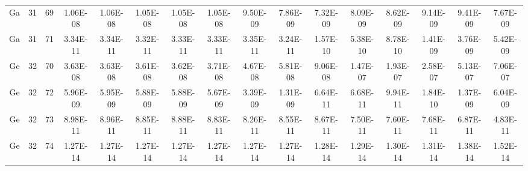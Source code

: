 {\begin{tabular}{|c|c|c|c|c|c|c|c|c|c|c|c|c|c|c|c|}
Ga & 31 & 69   & 1.06E-08 & 1.06E-08 & 1.05E-08 & 1.05E-08 & 1.05E-08 & 9.50E-09 & 7.86E-09 & 7.32E-09 & 8.09E-09 & 8.62E-09 & 9.14E-09 & 9.41E-09 & 7.67E-09 \\
Ga & 31 & 71   & 3.34E-11 & 3.34E-11 & 3.32E-11 & 3.33E-11 & 3.33E-11 & 3.35E-11 & 3.24E-11 & 1.57E-10 & 5.38E-10 & 8.78E-10 & 1.41E-09 & 3.76E-09 & 5.42E-09 \\
Ge & 32 & 70   & 3.63E-08 & 3.63E-08 & 3.61E-08 & 3.62E-08 & 3.71E-08 & 4.67E-08 & 5.81E-08 & 9.06E-08 & 1.47E-07 & 1.93E-07 & 2.58E-07 & 5.13E-07 & 7.06E-07 \\
Ge & 32 & 72   & 5.96E-09 & 5.95E-09 & 5.88E-09 & 5.88E-09 & 5.67E-09 & 3.39E-09 & 1.31E-09 & 6.64E-11 & 6.68E-11 & 9.94E-11 & 1.84E-10 & 1.37E-09 & 6.04E-09 \\
Ge & 32 & 73   & 8.98E-11 & 8.96E-11 & 8.85E-11 & 8.88E-11 & 8.83E-11 & 8.26E-11 & 8.55E-11 & 8.67E-11 & 7.50E-11 & 7.60E-11 & 7.68E-11 & 6.87E-11 & 4.83E-11 \\
Ge & 32 & 74   & 1.27E-14 & 1.27E-14 & 1.27E-14 & 1.27E-14 & 1.27E-14 & 1.27E-14 & 1.27E-14 & 1.28E-14 & 1.29E-14 & 1.30E-14 & 1.31E-14 & 1.38E-14 & 1.52E-14 \\





\hline

\end{tabular}}
